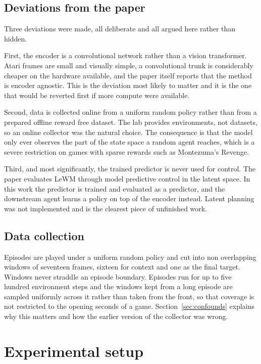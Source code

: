 \documentclass[11pt,a4paper]{article}
\begin{document}
\subsection{Deviations from the paper}

Three deviations were made, all deliberate and all argued here rather than hidden.

First, the encoder is a convolutional network rather than a vision transformer.
Atari frames are small and visually simple, a convolutional trunk is considerably
cheaper on the hardware available, and the paper itself reports that the method is
encoder agnostic. This is the deviation most likely to matter and it is the one
that would be reverted first if more compute were available.

Second, data is collected online from a uniform random policy rather than from a
prepared offline reward free dataset. The lab provides environments, not datasets,
so an online collector was the natural choice. The consequence is that the model
only ever observes the part of the state space a random agent reaches, which is a
severe restriction on games with sparse rewards such as Montezuma's Revenge.

Third, and most significantly, the trained predictor is never used for control.
The paper evaluates LeWM through model predictive control in the latent space. In
this work the predictor is trained and evaluated as a predictor, and the
downstream agent learns a policy on top of the encoder instead. Latent planning
was not implemented and is the clearest piece of unfinished work.

\subsection{Data collection}

Episodes are played under a uniform random policy and cut into non overlapping
windows of seventeen frames, sixteen for context and one as the final target.
Windows never straddle an episode boundary. Episodes run for up to five hundred
environment steps and the windows kept from a long episode are sampled uniformly
across it rather than taken from the front, so that coverage is not restricted to
the opening seconds of a game. Section~\ref{sec:confounds} explains why this
matters and how the earlier version of the collector was wrong.

\section{Experimental setup}
\end{document}

